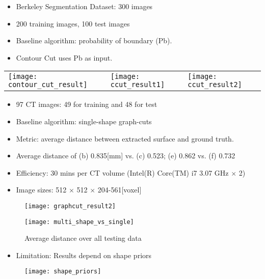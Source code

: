 \documentclass[11pt, a4paper, landscape]{article}
\begin{document}
\NewPage{}
\vfill
\begin{itemize}
\item Berkeley Segmentation Dataset: 300 images
\item 200 training images, 100 test images
\item Baseline algorithm: probability of boundary (Pb).
\item Contour Cut uses Pb as input.
\end{itemize}
\begin{table}
  \centering
  \begin{tabular}{@{} M{.4\linewidth} M{.3\linewidth} M{.3\linewidth} @{}}
      \texttt{[image: contour\_cut\_result]}%
      &
      \texttt{[image: ccut\_result1]}%
      &
      \texttt{[image: ccut\_result2]}%
  \end{tabular}
\end{table}
\vfill


\NewPage{}
\vfill
\begin{itemize}
\item 97 CT images: 49 for training and 48 for test
\item Baseline algorithm: single-shape graph-cuts
\item Metric: average distance between extracted surface and ground truth.
\item Average distance of (b) 0.835[mm] vs. (c) 0.523; (e) 0.862 vs. (f) 0.732
\item Efficiency: 30 mins per CT volume (Intel(R) Core(TM) i7 3.07 GHz $\times$ 2)
\item Image sizes: 512 $\times$ 512 $\times$ 204-561[voxel]
\end{itemize}
\begin{figure}
	\centering
	\texttt{[image: graphcut\_result2]}
\end{figure}
\vfill


\NewPage{}
\vfill
\begin{figure}
	\centering
	\texttt{[image: multi\_shape\_vs\_single]}
	\caption{Average distance over all testing data}
\end{figure}
\begin{itemize}
\item Limitation: Results depend on shape priors
\end{itemize}
\begin{figure}
	\centering
	\texttt{[image: shape\_priors]}
\end{figure}
\vfill
\end{document}
